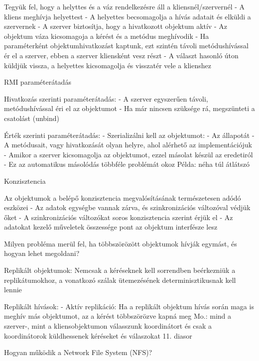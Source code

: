 \documentclass[12pt]{article}
\begin{document}
\begin{description}
    \item Tegyük fel, hogy a helyttes és a váz rendelkezésre áll a kliensnél/szervernél
        - A kliens meghívja helyettest
        - A helyettes becsomagolja a hívás adatait és elküldi a szervernek
        - A szerver biztosítja, hogy a hivatkozott objektum aktív
        - Az objektum váza kicsomagoja a kérést és a metódus meghívodik
        - Ha paraméterként objektumhivatkozást kaptunk, ezt szintén távoli metódushívással ér el a szerver,
        ebben a szerver kliensként vesz részt
        - A választ hasonló úton küldjük vissza, a helyettes kicsomagolja és visszatér vele a klienshez
    \item  RMI paraméterátadás
    \item Hivatkozás szerinti paraméterátadás:
        - A szerver egyszerűen távoli, metódushívással éri el az objektumot
        - Ha már nincsen szüksége rá, megszünteti a csatolást (unbind)
    \item Érték szerinti paraméterátadás: 
        - Szerializálni kell az objektumot:
        - Az állapotát
        - A metódusait, vagy hivatkozását olyan helyre, ahol alérhető az implementációjuk
        - Amikor a szerver kicsomagolja az objektumot, ezzel másolat készül az eredetiról
        - Ez az automatikus másolódás többféle problémát okoz Példa: néha túl átlátszó
    \item  Konzisztencia 
    \item Az objektumok a belépő konzisztencia megvalósításának természetesen adódó eszközei
        - Az adatok egységbe vannak zárva, és szinkronizációs változóval védjük őket
        - A szinkronizációs változókat soros konzisztencia szerint érjük el
        - Az adatokat kezelő műveletek összessége pont az objektum interfésze lesz
    \item  Milyen probléma merül fel, ha többszörözött objektumok hívják
        egymást, és hogyan lehet megoldani?  
    \item Replikált objektumok: Nemcsak a kéréseknek kell sorrendben beérkezniük a replikátumokhoz, a vonatkozó szálak ütemezésének
        determinisztikusnak kell lennie
    \item Replikált hívások:
        - Aktív replikáció: Ha a replikált objektum hívás során maga is meghív más objektumot, az a kérést többszörözve kapná meg
        Mo.: mind a szerver-, mint a kliensobjektumon válasszunk koordinátort és csak a koordinátorok küldhessenek kéréseket és válaszokat
        11. diasor
    \item  Hogyan működik a Network File System (NFS)?

\end{description}
\end{document}
